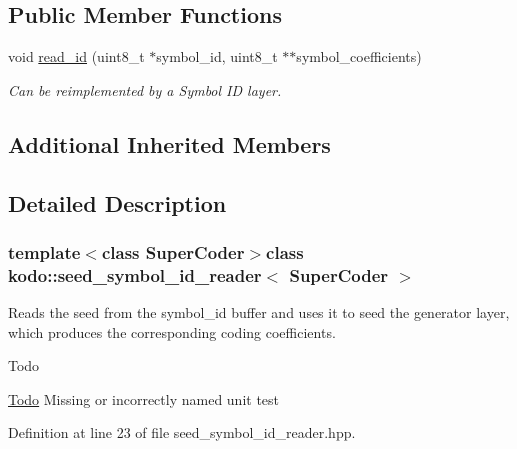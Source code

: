 \subsection*{Public Member Functions}
\begin{DoxyCompactItemize}
\item 
void \hyperlink{classkodo_1_1seed__symbol__id__reader_a026bf268db848cb0c999d637e09e6a9c}{read\-\_\-id} (uint8\-\_\-t $\ast$symbol\-\_\-id, uint8\-\_\-t $\ast$$\ast$symbol\-\_\-coefficients)
\begin{DoxyCompactList}\small\item\em Can be reimplemented by a Symbol I\-D layer. \end{DoxyCompactList}\end{DoxyCompactItemize}
\subsection*{Additional Inherited Members}


\subsection{Detailed Description}
\subsubsection*{template$<$class Super\-Coder$>$class kodo\-::seed\-\_\-symbol\-\_\-id\-\_\-reader$<$ Super\-Coder $>$}

Reads the seed from the symbol\-\_\-id buffer and uses it to seed the generator layer, which produces the corresponding coding coefficients. 

\begin{DoxyRefDesc}{Todo}
\item[\hyperlink{todo__todo000053}{Todo}]Missing or incorrectly named unit test \end{DoxyRefDesc}


Definition at line 23 of file seed\-\_\-symbol\-\_\-id\-\_\-reader.\-hpp.



